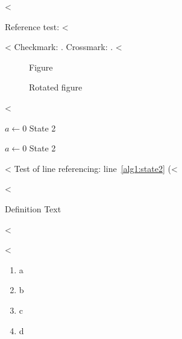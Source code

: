 <%
\label{ssec:example}

Reference test: <%

<%
Checkmark: \dingcheck.
Crossmark: \dingcross.
<%

\begin{figure}
  \missingfigure{}
  \caption{Figure}
  \label{fig:Abbildung}
\end{figure}

\begin{landscape}
  \begin{figure}
    \missingfigure{}
    \caption{Rotated figure}
    \label{fig:AbbildungGedreht}
  \end{figure}
\end{landscape}

<%

\begin{algorithm}
  \caption{$algo$}
  \label{alg:example}
  \begin{algorithmic}[1]
    \State $a \gets 0$
    \State State 2\label{alg1:state2}
  \end{algorithmic}
\end{algorithm}

\begin{algorithm}
  \caption{Algorithm 2}
  \label{alg:example2}
  \begin{algorithmic}[1]
    \State $a \gets 0$
    \State State 2\label{alg2:state2}
  \end{algorithmic}
\end{algorithm}

<%
Test of line referencing: line~\ref{alg1:state2} (<%

<%
\begin{definition}[Title]
  \label{def:def1}
  Definition Text
\end{definition}

<%

<%

\begin{enumerate}[label={(\alph*)}]
  \item a
  \item b
  \item c
  \item d
\end{enumerate}

